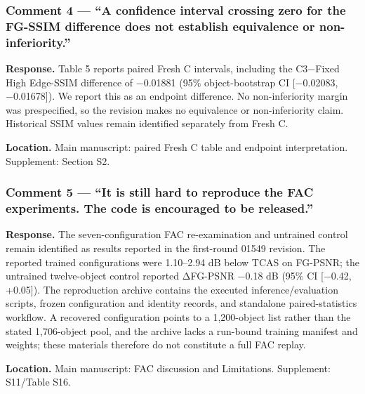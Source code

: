 \documentclass[
]{article}
\begin{document}
\hypertarget{comment-4-a-confidence-interval-crossing-zero-for-the-fg-ssim-difference-does-not-establish-equivalence-or-non-inferiority.}{%
\subsubsection{Comment 4 --- ``A confidence interval crossing zero for
the FG-SSIM difference does not establish equivalence or
non-inferiority.''}\label{comment-4-a-confidence-interval-crossing-zero-for-the-fg-ssim-difference-does-not-establish-equivalence-or-non-inferiority.}}

\textbf{Response.} Table 5 reports paired Fresh C intervals, including
the C3−Fixed High Edge-SSIM difference of −0.01881 (95\%
object-bootstrap CI {[}−0.02083, −0.01678{]}). We report this as an
endpoint difference. No non-inferiority margin was prespecified, so the
revision makes no equivalence or non-inferiority claim. Historical SSIM
values remain identified separately from Fresh C.

\textbf{Location.} Main manuscript: paired Fresh C table and endpoint
interpretation. Supplement: Section S2.

\hypertarget{comment-5-it-is-still-hard-to-reproduce-the-fac-experiments.-the-code-is-encouraged-to-be-released.}{%
\subsubsection{Comment 5 --- ``It is still hard to reproduce the FAC
experiments. The code is encouraged to be
released.''}\label{comment-5-it-is-still-hard-to-reproduce-the-fac-experiments.-the-code-is-encouraged-to-be-released.}}

\textbf{Response.} The seven-configuration FAC re-examination and
untrained control remain identified as results reported in the
first-round 01549 revision. The reported trained configurations were
1.10--2.94 dB below TCAS on FG-PSNR; the untrained twelve-object control
reported ΔFG-PSNR −0.18 dB (95\% CI {[}−0.42, +0.05{]}). The
reproduction archive contains the executed inference/evaluation scripts,
frozen configuration and identity records, and standalone
paired-statistics workflow. A recovered configuration points to a
1,200-object list rather than the stated 1,706-object pool, and the
archive lacks a run-bound training manifest and weights; these materials
therefore do not constitute a full FAC replay.

\textbf{Location.} Main manuscript: FAC discussion and Limitations.
Supplement: S11/Table S16.
\end{document}

